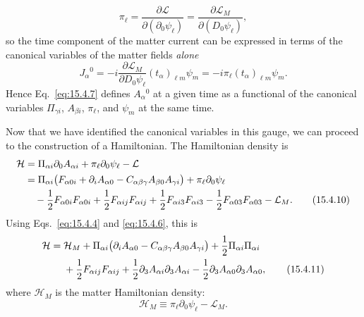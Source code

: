 \begin{equation}
  \pi_\ell=\frac{\partial\mathcal L}{\partial(\partial_0\psi_\ell)}
  =\frac{\partial\mathcal L_M}{\partial(D_0\psi_\ell)},
  \tag{15.4.8}\label{eq:15.4.8}
\end{equation}
so the time component of the matter current can be expressed in terms of the
canonical variables of the matter fields \emph{alone}
\begin{equation}
  J_\alpha{}^0=-i\frac{\partial\mathcal L_M}{\partial D_0\psi_\ell}
  (t_\alpha)_{\ell m}\psi_m
  =-i\pi_\ell(t_\alpha)_{\ell m}\psi_m.
  \tag{15.4.9}\label{eq:15.4.9}
\end{equation}
Hence Eq.~\eqref{eq:15.4.7} defines $A_\alpha{}^0$ at a given time as a
functional of the canonical variables $\Pi_{\gamma i}$, $A_{\beta i}$,
$\pi_\ell$, and $\psi_m$ at the same time.

Now that we have identified the canonical variables in this gauge, we can
proceed to the construction of a Hamiltonian. The Hamiltonian density is
\begin{align}
  \mathcal H
  &=\Pi_{\alpha i}\partial_0A_{\alpha i}
  +\pi_\ell\partial_0\psi_\ell-\mathcal L
  \notag\\
 &=\Pi_{\alpha i}\bigl(F_{\alpha0i}+\partial_iA_{\alpha0}
 -C_{\alpha\beta\gamma}A_{\beta0}A_{\gamma i}\bigr)
  +\pi_\ell\partial_0\psi_\ell
  \notag\\
  &\quad-\frac12F_{\alpha0i}F_{\alpha0i}
  +\frac12F_{\alpha ij}F_{\alpha ij}
  +\frac12F_{\alpha i3}F_{\alpha i3}
  -\frac12F_{\alpha03}F_{\alpha03}-\mathcal L_M.
  \tag{15.4.10}\label{eq:15.4.10}
\end{align}
Using Eqs.~\eqref{eq:15.4.4} and \eqref{eq:15.4.6}, this is
\begin{align}
  \mathcal H={}&\mathcal H_M
 +\Pi_{\alpha i}\bigl(\partial_iA_{\alpha0}
 -C_{\alpha\beta\gamma}A_{\beta0}A_{\gamma i}\bigr)
  +\frac12\Pi_{\alpha i}\Pi_{\alpha i}
  \notag\\
  &+\frac12F_{\alpha ij}F_{\alpha ij}
  +\frac12\partial_3A_{\alpha i}\partial_3A_{\alpha i}
  -\frac12\partial_3A_{\alpha0}\partial_3A_{\alpha0},
  \tag{15.4.11}\label{eq:15.4.11}
\end{align}
where $\mathcal H_M$ is the matter Hamiltonian density:
\begin{equation}
  \mathcal H_M\equiv\pi_\ell\partial_0\psi_\ell-\mathcal L_M.
  \tag{15.4.12}\label{eq:15.4.12}
\end{equation}


